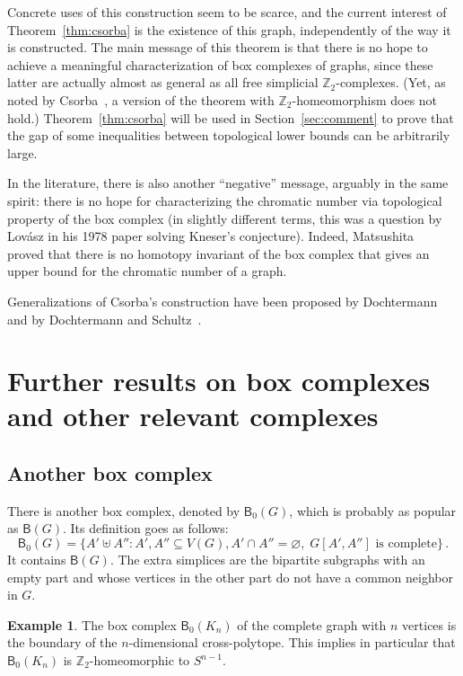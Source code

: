 \documentclass[12pt]{amsart}
\theoremstyle{definition}
\newtheorem{example}{Example}
\def\Z{\mathbb{Z}}
\def\B{\mathsf{B}}
\begin{document}
Concrete uses of this construction seem to be scarce, and the current interest of Theorem~\ref{thm:csorba} is the existence of this graph, independently of the way it is constructed. The main message of this theorem is that there is no hope to achieve a meaningful characterization of box complexes of graphs, since these latter are actually almost as general as all free simplicial $\Z_2$-complexes. (Yet, as noted by Csorba~\cite{csorba2007homotopy}, a version of the theorem with $\Z_2$-homeomorphism does not hold.) Theorem~\ref{thm:csorba} will be used in Section~\ref{sec:comment} to prove that the gap of some inequalities between topological lower bounds can be arbitrarily large.

In the literature, there is also another ``negative'' message, arguably in the same spirit: there is no hope for characterizing the chromatic number via topological property of the box complex (in slightly different terms, this was a question by Lov\'asz in his 1978 paper solving Kneser's conjecture). Indeed, Matsushita~\cite{matsushita2017homotopy} proved that there is no homotopy invariant of the box complex that gives an upper bound for the chromatic number of a graph.

Generalizations of Csorba's construction have been proposed by Dochtermann~\cite{dochtermann2009universality} and by Dochtermann and Schultz~\cite{dochtermann2012topology}.

\section{Further results on box complexes and other relevant complexes} \label{sec:complex}

\subsection{Another box complex}\label{subsec:another} There is another box complex, denoted by $\B_0(G)$, which is probably as popular as $\B(G)$. Its definition goes as follows:
\[
\B_0(G) = \big\{ A' \uplus A'' \colon A',A'' \subseteq V(G), A' \cap A'' = \varnothing, \; G[A',A''] \text{ is complete} \big\} \, .
\]
It contains $\B(G)$. The extra simplices are the bipartite subgraphs with an empty part and whose vertices in the other part do not have a common neighbor in $G$.

\begin{example}\label{ex:box0-complete}
The box complex $\B_0(K_n)$ of the complete graph with $n$ vertices is the boundary of the $n$-dimensional cross-polytope. This implies in particular that $\B_0(K_n)$ is $\Z_2$-homeomorphic to $S^{n-1}$.
\end{example}
\end{document}
